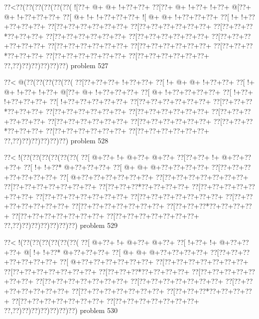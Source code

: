 \vbox{\vbox{\goo
\0??<\0??(\0??(\0??(\0??(\0??(\0??(
\- ![\0??+\- @+\- @+\- !+\0??+\0??+
\0??[\0??+\- @+\- !+\0??+\- !+\0??+
\- @[\0??+\- @+\- !+\0??+\0??+\0??+
\0??[\- @+\- !+\- !+\0??+\0??+\0??+
\- ![\- @+\- @+\- !+\0??+\0??+\0??+
\0??[\- !+\- !+\0??+\0??+\0??+\0??+
\0??[\0??+\0??+\0??+\0??+\0??+\0??+
\0??[\0??+\0??+\0??+\0??+\0??+\0??+
\0??[\0??+\0??+\0??*\0??+\0??+\0??+
\0??[\0??+\0??+\0??+\0??+\0??+\0??+
\0??[\0??+\0??+\0??+\0??+\0??+\0??+
\0??[\0??+\0??+\0??+\0??+\0??+\0??+
\0??[\0??+\0??+\0??+\0??+\0??+\0??+
\0??[\0??+\0??+\0??+\0??+\0??+\0??+
\0??[\0??+\0??+\0??*\0??+\0??+\0??+
\0??[\0??+\0??+\0??+\0??+\0??+\0??+
\0??[\0??+\0??+\0??+\0??+\0??+\0??+
\0??,\0??)\0??)\0??)\0??)\0??)\0??)
}
\hfil problem 527\hfil\break
}

\vbox{\vbox{\goo
\0??<\- @(\0??(\0??(\0??(\0??(\0??(
\0??[\0??+\0??+\0??+\- !+\0??+\0??+
\0??[\- !+\- @+\- @+\- !+\0??+\0??+
\0??[\- !+\- @+\- !+\0??+\- !+\0??+
\- @[\0??+\- @+\- !+\0??+\0??+\0??+
\0??[\- @+\- !+\0??+\0??+\0??+\0??+
\0??[\- !+\0??+\- !+\0??+\0??+\0??+
\0??[\- !+\0??+\0??+\0??+\0??+\0??+
\0??[\0??+\0??+\0??+\0??+\0??+\0??+
\0??[\0??+\0??+\0??*\0??+\0??+\0??+
\0??[\0??+\0??+\0??+\0??+\0??+\0??+
\0??[\0??+\0??+\0??+\0??+\0??+\0??+
\0??[\0??+\0??+\0??+\0??+\0??+\0??+
\0??[\0??+\0??+\0??+\0??+\0??+\0??+
\0??[\0??+\0??+\0??+\0??+\0??+\0??+
\0??[\0??+\0??+\0??*\0??+\0??+\0??+
\0??[\0??+\0??+\0??+\0??+\0??+\0??+
\0??[\0??+\0??+\0??+\0??+\0??+\0??+
\0??,\0??)\0??)\0??)\0??)\0??)\0??)
}
\hfil problem 528\hfil\break
}

\vbox{\vbox{\goo
\0??<\- !(\0??(\0??(\0??(\0??(\0??(\0??(
\0??[\- @+\0??+\- !+\- @+\0??+\- @+\0??+
\0??[\0??+\0??+\- !+\- @+\0??+\0??+\0??+
\0??[\- !+\- !+\0??*\- @+\0??+\0??+\0??+
\0??[\- @+\- @+\- @+\0??+\0??+\0??+\0??+
\0??[\0??+\0??+\0??+\0??+\0??+\0??+\0??+
\0??[\- @+\0??+\0??+\0??+\0??+\0??+\0??+
\0??[\0??+\0??+\0??+\0??+\0??+\0??+\0??+
\0??[\0??+\0??+\0??+\0??+\0??+\0??+\0??+
\0??[\0??+\0??+\0??*\0??+\0??+\0??+\0??+
\0??[\0??+\0??+\0??+\0??+\0??+\0??+\0??+
\0??[\0??+\0??+\0??+\0??+\0??+\0??+\0??+
\0??[\0??+\0??+\0??+\0??+\0??+\0??+\0??+
\0??[\0??+\0??+\0??+\0??+\0??+\0??+\0??+
\0??[\0??+\0??+\0??+\0??+\0??+\0??+\0??+
\0??[\0??+\0??+\0??*\0??+\0??+\0??+\0??+
\0??[\0??+\0??+\0??+\0??+\0??+\0??+\0??+
\0??[\0??+\0??+\0??+\0??+\0??+\0??+\0??+
\0??,\0??)\0??)\0??)\0??)\0??)\0??)\0??)
}
\hfil problem 529\hfil\break
}

\vbox{\vbox{\goo
\0??<\- !(\0??(\0??(\0??(\0??(\0??(\0??(
\0??[\- @+\0??+\- !+\- @+\0??+\- @+\0??+
\0??[\- !+\0??+\- !+\- @+\0??+\0??+\0??+
\- @[\- !+\- !+\0??*\- @+\0??+\0??+\0??+
\0??[\- @+\- @+\- @+\0??+\0??+\0??+\0??+
\0??[\0??+\0??+\0??+\0??+\0??+\0??+\0??+
\0??[\- @+\0??+\0??+\0??+\0??+\0??+\0??+
\0??[\0??+\0??+\0??+\0??+\0??+\0??+\0??+
\0??[\0??+\0??+\0??+\0??+\0??+\0??+\0??+
\0??[\0??+\0??+\0??*\0??+\0??+\0??+\0??+
\0??[\0??+\0??+\0??+\0??+\0??+\0??+\0??+
\0??[\0??+\0??+\0??+\0??+\0??+\0??+\0??+
\0??[\0??+\0??+\0??+\0??+\0??+\0??+\0??+
\0??[\0??+\0??+\0??+\0??+\0??+\0??+\0??+
\0??[\0??+\0??+\0??+\0??+\0??+\0??+\0??+
\0??[\0??+\0??+\0??*\0??+\0??+\0??+\0??+
\0??[\0??+\0??+\0??+\0??+\0??+\0??+\0??+
\0??[\0??+\0??+\0??+\0??+\0??+\0??+\0??+
\0??,\0??)\0??)\0??)\0??)\0??)\0??)\0??)
}
\hfil problem 530\hfil\break
}

